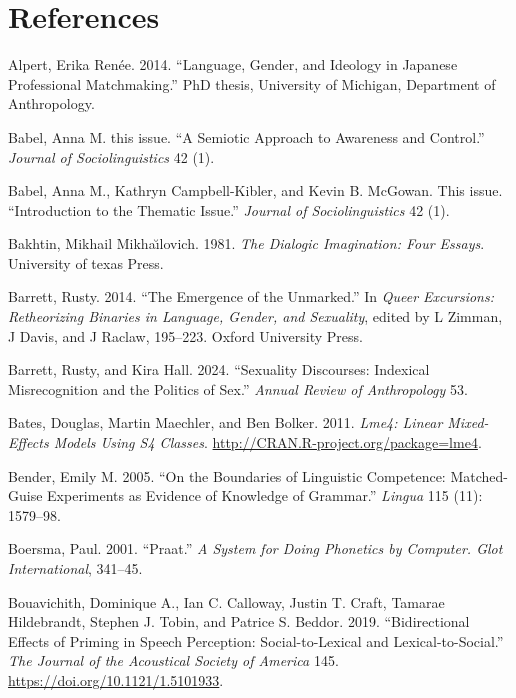 \documentclass[
  letterpaper,
  DIV=11,
  numbers=noendperiod]{scrartcl}
\newlength{\cslhangindent}
\newenvironment{CSLReferences}[2] %
 {\begin{list}{}{%
  \setlength{\itemindent}{0pt}
  \setlength{\leftmargin}{0pt}
  \setlength{\parsep}{0pt}
  \ifodd #1
   \setlength{\leftmargin}{\cslhangindent}
   \setlength{\itemindent}{-1\cslhangindent}
  \fi
  \setlength{\itemsep}{#2\baselineskip}}}
 {\end{list}}
\begin{document}
\section*{References}\label{sec-references}

\label{refs}
\begin{CSLReferences}{1}{0}
Alpert, Erika Renée. 2014. {``Language, Gender, and Ideology in Japanese
Professional Matchmaking.''} PhD thesis, University of Michigan,
Department of Anthropology.

Babel, Anna M. this issue. {``A Semiotic Approach to Awareness and
Control.''} \emph{Journal of Sociolinguistics} 42 (1).

Babel, Anna M., Kathryn Campbell-Kibler, and Kevin B. McGowan. This
issue. {``Introduction to the Thematic Issue.''} \emph{Journal of
Sociolinguistics} 42 (1).

Bakhtin, Mikhail Mikhaı̆lovich. 1981. \emph{The Dialogic Imagination:
Four Essays}. University of texas Press.

Barrett, Rusty. 2014. {``The Emergence of the Unmarked.''} In
\emph{Queer Excursions: Retheorizing Binaries in Language, Gender, and
Sexuality}, edited by L Zimman, J Davis, and J Raclaw, 195--223. Oxford
University Press.

Barrett, Rusty, and Kira Hall. 2024. {``Sexuality Discourses: Indexical
Misrecognition and the Politics of Sex.''} \emph{Annual Review of
Anthropology} 53.

Bates, Douglas, Martin Maechler, and Ben Bolker. 2011. \emph{Lme4:
Linear Mixed-Effects Models Using S4 Classes}.
\url{http://CRAN.R-project.org/package=lme4}.

Bender, Emily M. 2005. {``On the Boundaries of Linguistic Competence:
Matched-Guise Experiments as Evidence of Knowledge of Grammar.''}
\emph{Lingua} 115 (11): 1579--98.

Boersma, Paul. 2001. {``Praat.''} \emph{A System for Doing Phonetics by
Computer. {Glot} {International}}, 341--45.

Bouavichith, Dominique A., Ian C. Calloway, Justin T. Craft, Tamarae
Hildebrandt, Stephen J. Tobin, and Patrice S. Beddor. 2019.
{``Bidirectional Effects of Priming in Speech Perception:
Social-to-Lexical and Lexical-to-Social.''} \emph{The Journal of the
Acoustical Society of America} 145.
\url{https://doi.org/10.1121/1.5101933}.


\end{CSLReferences}
\end{document}
